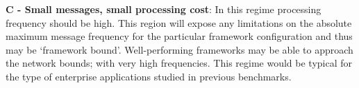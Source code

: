 \documentclass[conference]{IEEEtran}
\begin{document}

\textbf{C - Small messages, small processing cost}: In this regime processing frequency should be high. This region will expose any limitations on the absolute maximum message frequency for the particular framework configuration and thus may be `framework bound'. Well-performing frameworks may be able to approach the network bounds; with very high frequencies. This regime would be typical for the type of enterprise applications studied in previous benchmarks.










\end{document}
